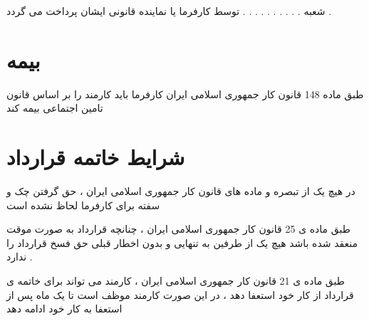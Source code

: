 \documentclass[12pt]{article}
\begin{document}
شعبه . . . . . . . . . . توسط کارفرما یا نماینده قانونی ایشان پرداخت می گردد .


\section{بیمه}

طبق ماده 148 قانون کار جمهوری اسلامی ایران کارفرما باید کارمند را بر اساس قانون تامین اجتماعی بیمه کند 


\newpage



\section{شرایط خاتمه قرارداد}

\begin{tcolorbox}[
title=تبصره 4
]
در هیچ یک از تبصره و ماده های قانون کار جمهوری اسلامی ایران ، حق گرفتن چک و سفته برای کارفرما لحاظ نشده است
\end{tcolorbox}


طبق ماده ی 25 قانون کار جمهوری اسلامی ایران ، چنانچه قرارداد به صورت موقت منعقد شده باشد هیچ یک از طرفین به تنهایی و بدون اخطار قبلی حق فسخ قرارداد را ندارد .

طبق ماده ی 21 قانون کار جمهوری اسلامی ایران ، کارمند می تواند برای خاتمه ی قرارداد از کار خود استعفا دهد ، در این صورت کارمند موظف است تا یک ماه پس از استعفا به کار خود ادامه دهد
\end{document}
